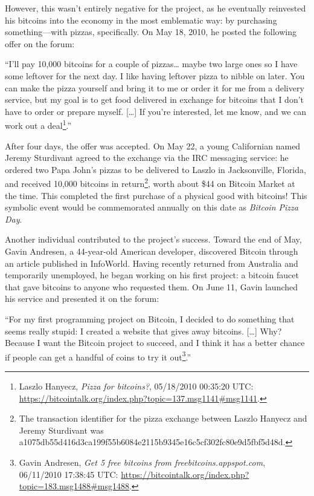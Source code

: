 \documentclass[
  a5paper,
  smalldemyvopaper,10pt,twoside,onecolumn,openright,extrafontsizes,hidelinks]{memoir}
\begin{document}
However, this wasn't entirely negative for the project, as he eventually
reinvested his bitcoins into the economy in the most emblematic way: by
purchasing something---with pizzas, specifically. On May 18, 2010, he
posted the following offer on the forum:

``I'll pay 10,000 bitcoins for a couple of pizzas\ldots{} maybe two
large ones so I have some leftover for the next day. I like having
leftover pizza to nibble on later. You can make the pizza yourself and
bring it to me or order it for me from a delivery service, but my goal
is to get food delivered in exchange for bitcoins that I don't have to
order or prepare myself. {[}\ldots{]} If you're interested, let me know,
and we can work out a deal\footnote{Laszlo Hanyecz, \emph{Pizza for
  bitcoins?}, 05/18/2010 00:35:20 UTC:
  \url{https://bitcointalk.org/index.php?topic=137.msg1141\#msg1141}.}.''

After four days, the offer was accepted. On May 22, a young Californian
named Jeremy Sturdivant agreed to the exchange via the IRC messaging
service: he ordered two Papa John's pizzas to be delivered to Laszlo in
Jacksonville, Florida, and received 10,000 bitcoins in
return\footnote{The transaction identifier for the pizza exchange
  between Laszlo Hanyecz and Jeremy Sturdivant was
  a1075db55d416d3ca199f55b6084e2115b9345e16c5cf302fc80e9d5fbf5d48d.},
worth about \$44 on Bitcoin Market at the time. This completed the first
purchase of a physical good with bitcoins! This symbolic event would be
commemorated annually on this date as \emph{Bitcoin Pizza Day}.

Another individual contributed to the project's success. Toward the end
of May, Gavin Andresen, a 44-year-old American developer, discovered
Bitcoin through an article published in InfoWorld. Having recently
returned from Australia and temporarily unemployed, he began working on
his first project: a bitcoin faucet that gave bitcoins to anyone who
requested them. On June 11, Gavin launched his service and presented it
on the forum:

``For my first programming project on Bitcoin, I decided to do something
that seems really stupid: I created a website that gives away bitcoins.
{[}\ldots{]} Why? Because I want the Bitcoin project to succeed, and I
think it has a better chance if people can get a handful of coins to try
it out\footnote{Gavin Andresen, \emph{Get 5 free bitcoins from
  freebitcoins.appspot.com}, 06/11/2010 17:38:45 UTC:
  \url{https://bitcointalk.org/index.php?topic=183.msg1488\#msg1488}.}.''
\end{document}
